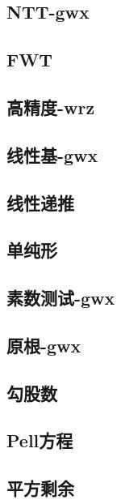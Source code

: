 \documentclass[titlepage,a4paper,10pt]{article}
\begin{document}
\begin{multicols}{2}
\begin{spacing}{0.8}
			\subsection{NTT-gwx}
				
			\subsection{FWT}
				
			\subsection{高精度-wrz}
				
			\subsection{线性基-gwx}
				
			\subsection{线性递推}
				
			\subsection{单纯形}
				
			\subsection{素数测试-gwx}
				
			\subsection{原根-gwx}
				
			\subsection{勾股数}
				
			\subsection{Pell方程}
				
			\subsection{平方剩余}
				

\end{spacing}
\end{multicols}
\end{document}
